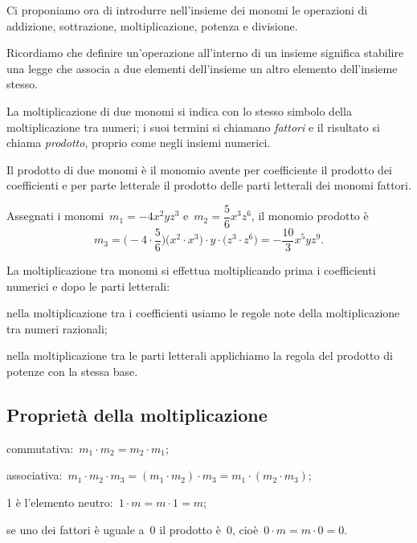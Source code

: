 Ci proponiamo ora di introdurre nell'insieme dei monomi
le operazioni di addizione, sottrazione, moltiplicazione, potenza e
divisione.

Ricordiamo che definire un'operazione all'interno di un insieme
significa stabilire una legge che associa a due elementi
dell'insieme un altro elemento
dell'insieme stesso.

La moltiplicazione di due monomi si indica con lo stesso simbolo della
moltiplicazione tra numeri; i suoi termini si chiamano \emph{fattori} e il
risultato si chiama \emph{prodotto}, proprio come negli insiemi numerici.

\begin{definizione}
 Il prodotto di due monomi è il monomio avente
per coefficiente il prodotto dei coefficienti e per parte letterale il
prodotto delle parti letterali dei monomi fattori.
\end{definizione}

\begin{exrig}
 \begin{esempio}
Assegnati i monomi~$m_{1}=-4x^{2}yz^{3}$ e~$m_{2}=\dfrac{5}{6}x^{3}z^{6}$,
il monomio prodotto è
\[m_{3}=\bigg(-4\cdot {\frac{5}{6}}\bigg)\big(x^{2}\cdot x^{3}\big)\cdot y\cdot \big(z^{3}\cdot z^{6}\big)=-\frac{10}{3}x^{5}yz^{9}.\]
 \end{esempio}
\end{exrig}


\begin{procedura}
La moltiplicazione tra monomi si effettua moltiplicando prima i
coefficienti numerici e dopo le parti letterali:

\begin{enumeratea}
 \item nella moltiplicazione tra i coefficienti usiamo le regole note della
moltiplicazione tra numeri razionali;
 \item nella moltiplicazione tra le parti letterali applichiamo la regola
del prodotto di potenze con la stessa base.
\end{enumeratea}
\end{procedura}

\subsection{Proprietà della moltiplicazione}

\begin{enumeratea}
\item commutativa:~$m_{{1}}\cdot m_{2}=m_{2}\cdot m_{{1}}$;
\item associativa:~$m_{{1}}\cdot m_{2}\cdot m_{3}=(m_{{1}}\cdot m_{2})\cdot m_{3}=m_{{1}}\cdot (m_{2}\cdot m_{3})$;
\item 1 è l'elemento neutro:~$1\cdot m=m\cdot 1=m$;
\item se uno dei fattori è uguale a~0 il prodotto è~0, cioè~$0\cdot m=m\cdot 0=0$.
\end{enumeratea}


